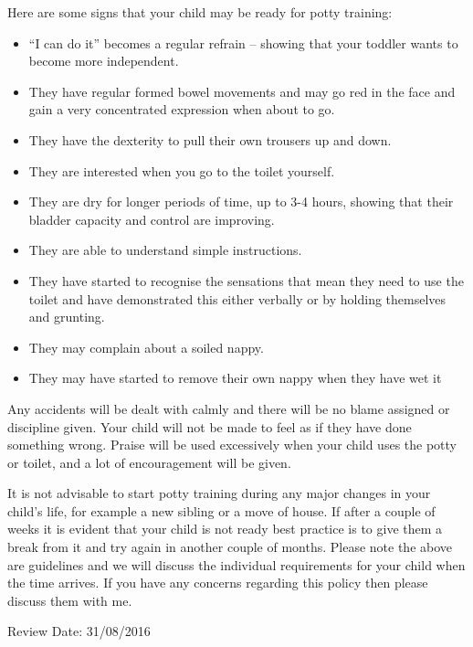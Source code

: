 Here are some signs that your child may be ready for potty training:
\begin{itemize}
\item ``I can do it'' becomes a regular refrain -- showing that your toddler wants to become more independent.
\item They have regular formed bowel movements and may go red in the face and gain a very concentrated expression when about to go.
\item They have the dexterity to pull their own trousers up and down.
\item They are interested when you go to the toilet yourself.
\item They are dry for longer periods of time, up to 3-4 hours, showing that their bladder capacity and control are improving.
\item They are able to understand simple instructions.
\item They have started to recognise the sensations that mean they need to use the toilet and have demonstrated this either verbally or by holding themselves and grunting.
\item They may complain about a soiled nappy.
\item They may have started to remove their own nappy when they have wet it
\end{itemize}

Any accidents will be dealt with calmly and there will be no blame assigned or discipline given. Your child will not be made to feel as if they have done something wrong. Praise will be used excessively when your child uses the potty or toilet, and a lot of encouragement will be given. 

It is not advisable to start potty training during any major changes in your child's life, for example a new sibling or a move of house. If after a couple of weeks it is evident that your child is not ready best practice is to give them a break from it and try again in another couple of months. Please note the above are guidelines and we will discuss the individual requirements for your child when the time arrives. If you have any concerns regarding this policy then please discuss them with me.

Review Date: 31/08/2016


